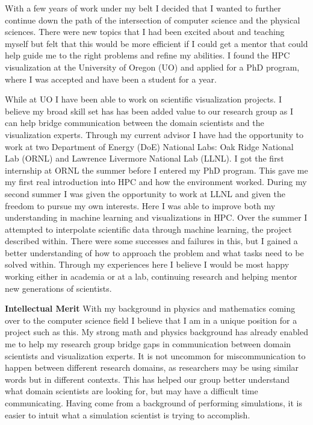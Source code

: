 \documentclass[12pt]{article}
\begin{document}
With a few years of work under my belt I decided that I wanted to further
continue down the path of the intersection of computer science and the physical
sciences. There were new topics that I had been excited about and teaching
myself but felt that this would be more efficient if I could get a mentor that
could help guide me to the right problems and refine my abilities. I found the
HPC visualization at the University of Oregon (UO) and applied for a PhD program,
where I was accepted and have been a student for a year. 

While at UO I have been able to work on scientific visualization projects. I
believe my broad skill set has has been added value to our research group as I
can help bridge communication between the domain scientists and the
visualization experts. Through my current advisor I have had the opportunity to
work at two Department of Energy (DoE) National Labs: Oak Ridge National Lab
(ORNL) and Lawrence Livermore National Lab (LLNL). I got the first internship at
ORNL the summer before I entered my PhD program. This gave me my first real
introduction into HPC and how the environment worked. During my second summer I
was given the opportunity to work at LLNL and given the freedom to pursue my own
interests. Here I was able to improve both my understanding in machine learning
and visualizations in HPC. Over the summer I attempted to interpolate scientific
data through machine learning, the project described within. There were some
successes and failures in this, but I gained a better understanding of how to
approach the problem and what tasks need to be solved within. Through my
experiences here I believe I would be most happy working either in academia or
at a lab, continuing research and helping mentor new generations of scientists. 

\textbf{Intellectual Merit}
%
With my background in physics and mathematics coming over to the computer
science field I believe that I am in a unique position for a project such as
this. My strong math and physics background has already enabled me to help my
research group bridge gaps in communication between domain scientists and
visualization experts. It is not uncommon for miscommunication to happen between
different research domains, as researchers may be using similar words but in
different contexts. This has helped our group better understand what domain
scientists are looking for, but may have a difficult time communicating. Having
come from a background of performing simulations, it is easier to intuit what a
simulation scientist is trying to accomplish.
\end{document}
